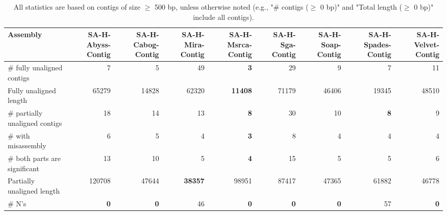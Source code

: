 \documentclass[12pt,a4paper]{article}
\begin{document}
\begin{table}[ht]
\begin{center}
\caption{All statistics are based on contigs of size $\geq$ 500 bp, unless otherwise noted (e.g., "\# contigs ($\geq$ 0 bp)" and "Total length ($\geq$ 0 bp)" include all contigs).}
\begin{tabular}{|l*{8}{|r}|}
\hline
Assembly & SA-H-Abyss-Contig & SA-H-Cabog-Contig & SA-H-Mira-Contig & SA-H-Msrca-Contig & SA-H-Sga-Contig & SA-H-Soap-Contig & SA-H-Spades-Contig & SA-H-Velvet-Contig \\ \hline
\# fully unaligned contigs & 7 & 5 & 49 & {\bf 3} & 29 & 9 & 7 & 11 \\ \hline
Fully unaligned length & 65279 & 14828 & 62320 & {\bf 11408} & 71179 & 46406 & 19345 & 48510 \\ \hline
\# partially unaligned contigs & 18 & 14 & 13 & {\bf 8} & 30 & 10 & {\bf 8} & 9 \\ \hline
\hspace{5mm}\# with misassembly & 6 & 5 & 4 & {\bf 3} & 8 & 4 & 4 & 4 \\ \hline
\hspace{5mm}\# both parts are significant & 13 & 10 & 5 & {\bf 4} & 15 & 5 & 5 & 6 \\ \hline
Partially unaligned length & 120708 & 47644 & {\bf 38357} & 98951 & 87417 & 47365 & 61882 & 46778 \\ \hline
\# N's & {\bf 0} & {\bf 0} & 46 & {\bf 0} & {\bf 0} & {\bf 0} & 57 & {\bf 0} \\ \hline
\end{tabular}
\end{center}
\end{table}
\end{document}
